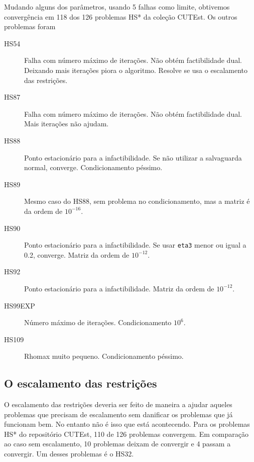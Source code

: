 \documentclass{article}
\begin{document}
Mudando alguns dos parâmetros, usando 5 falhas como limite, obtivemos
convergência em 118 dos 126 problemas HS* da coleção CUTEst.
Os outros problemas foram
\begin{description}
  \item[HS54] Falha com número máximo de iterações. Não obtém factibilidade
    dual. Deixando mais iterações piora o algoritmo. Resolve se usa o
    escalamento das restrições.
  \item[HS87] Falha com número máximo de iterações. Não obtém factibilidade
    dual. Mais iterações não ajudam.
  \item[HS88] Ponto estacionário para a infactibilidade. Se não utilizar a
    salvaguarda normal, converge. Condicionamento péssimo.
  \item[HS89] Mesmo caso do HS88, sem problema no condicionamento, mas a matriz
    é da ordem de $10^{-16}$.
  \item[HS90] Ponto estacionário para a infactibilidade. Se usar \verb+eta3+
    menor ou igual a 0.2, converge. Matriz da ordem de $10^{-12}$.
  \item[HS92] Ponto estacionário para a infactibilidade. Matriz da ordem de
    $10^{-12}$.
  \item[HS99EXP] Número máximo de iterações. Condicionamento $10^6$.
  \item[HS109] Rhomax muito pequeno. Condicionamento péssimo.
\end{description}

\subsection{O escalamento das restrições}

O escalamento das restrições deveria ser feito de maneira a ajudar aqueles
problemas que precisam de escalamento sem danificar os problemas que já
funcionam bem. No entanto não é isso que está acontecendo. Para os problemas HS*
do repositório CUTEst, 110 de 126 problemas convergem. Em comparação ao caso sem
escalamento, 10 problemas deixam de convergir e 4 passam a convergir.
Um desses problemas é o HS32.



\end{document}
